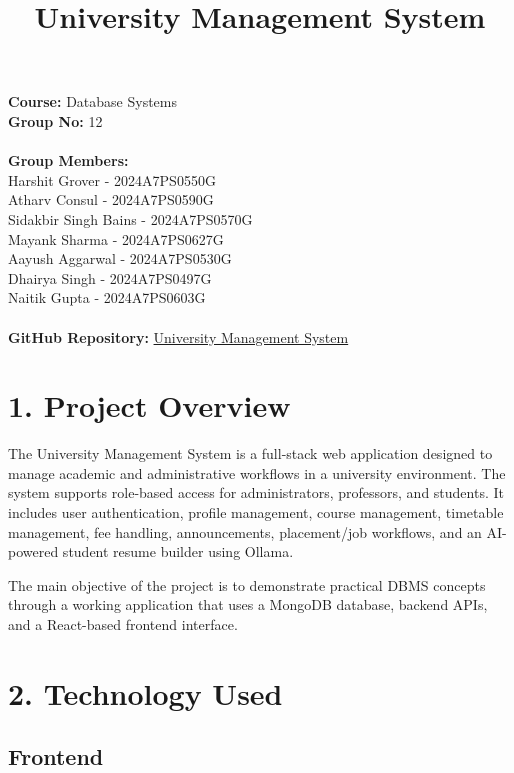 \documentclass[12pt]{article}
\title{\textbf{University Management System}}
\date{}
\begin{document}
\maketitle
\vspace{-7.5em}

\noindent \textbf{Course:} Database Systems \\
\textbf{Group No:} 12 \\ \\
\textbf{Group Members:} \\
Harshit Grover - 2024A7PS0550G \\
Atharv Consul - 2024A7PS0590G \\
Sidakbir Singh Bains - 2024A7PS0570G \\
Mayank Sharma - 2024A7PS0627G \\
Aayush Aggarwal - 2024A7PS0530G \\
Dhairya Singh - 2024A7PS0497G \\
Naitik Gupta - 2024A7PS0603G \\ \\
\textbf{GitHub Repository:} \href{https://github.com/harshitgrover/University-Management-System}{University Management System} 
\vspace{0.5em}

\section*{1. Project Overview}

The University Management System is a full-stack web application designed to manage academic and administrative workflows in a university environment. The system supports role-based access for administrators, professors, and students. It includes user authentication, profile management, course management, timetable management, fee handling, announcements, placement/job workflows, and an AI-powered student resume builder using Ollama.

The main objective of the project is to demonstrate practical DBMS concepts through a working application that uses a MongoDB database, backend APIs, and a React-based frontend interface.

\section*{2. Technology Used}

\subsection*{Frontend}
\end{document}
